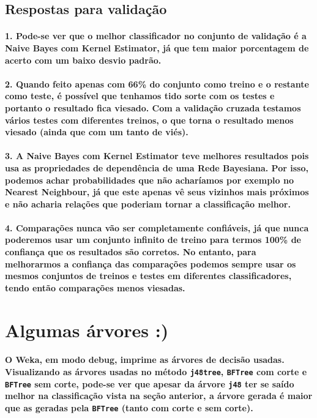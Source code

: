 \documentclass[a4paper,10pt]{article}
\theoremstyle{plain}
\begin{document}
\subsection{Respostas para validação}

\paragraph{
  1. Pode-se ver que o melhor classificador no conjunto de validação é a Naive Bayes com Kernel
  Estimator, já que tem maior porcentagem de acerto com um baixo desvio padrão.
}

\paragraph{
  2. Quando feito apenas com 66\% do conjunto como treino e o restante como teste, é possível que
  tenhamos tido sorte com os testes e portanto o resultado fica viesado. Com a validação cruzada
  testamos vários testes com diferentes treinos, o que torna o resultado menos viesado (ainda que
  com um tanto de viés).
}

\paragraph{
  3. A Naive Bayes com Kernel Estimator teve melhores resultados pois usa as propriedades de
  dependência de uma Rede Bayesiana. Por isso, podemos achar probabilidades que não acharíamos por
  exemplo no Nearest Neighbour, já que este apenas vê seus vizinhos mais próximos e não acharia
  relações que poderiam tornar a classificação melhor.
}

\paragraph{
  4. Comparações nunca vão ser completamente confiáveis, já que nunca poderemos usar um conjunto
  infinito de treino para termos 100\% de confiança que os resultados são corretos. No entanto,
  para melhorarmos a confiança das comparações podemos sempre usar os mesmos conjuntos de treinos
  e testes em diferentes classificadores, tendo então comparações menos viesadas.
}

\section{Algumas árvores :)}

\paragraph {
  O Weka, em modo debug, imprime as árvores de decisão usadas. Visualizando as árvores usadas no
  método \texttt{j48tree}, \texttt{BFTree} com corte e \texttt{BFTree} sem corte, pode-se ver que
  apesar da árvore \texttt{j48} ter se saído melhor na classificação vista na seção anterior, a
  árvore gerada é maior que as geradas pela \texttt{BFTree} (tanto com corte e sem corte).
}
\end{document}

